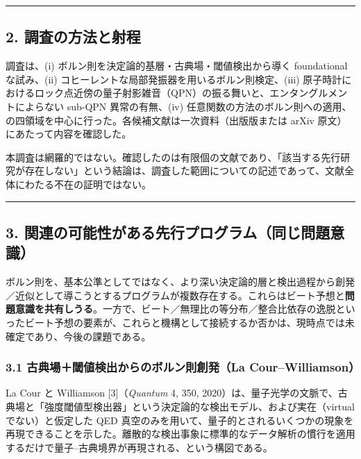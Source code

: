 \documentclass[
]{ltjsarticle}
\begin{document}
\begin{center}\rule{0.5\linewidth}{0.5pt}\end{center}

\subsection{2.
調査の方法と射程}\label{ux8abfux67fbux306eux65b9ux6cd5ux3068ux5c04ux7a0b}

調査は、(i) ボルン則を決定論的基層・古典場・閾値検出から導く
foundational な試み、(ii)
コヒーレントな局部発振器を用いるボルン則検定、(iii)
原子時計におけるロック点近傍の量子射影雑音（QPN）の振る舞いと、エンタングルメントによらない
sub-QPN 異常の有無、(iv)
任意関数の方法のボルン則への適用、の四領域を中心に行った。各候補文献は一次資料（出版版または
arXiv 原文）にあたって内容を確認した。

本調査は網羅的ではない。確認したのは有限個の文献であり、「該当する先行研究が存在しない」という結論は、調査した範囲についての記述であって、文献全体にわたる不在の証明ではない。

\begin{center}\rule{0.5\linewidth}{0.5pt}\end{center}

\subsection{3.
関連の可能性がある先行プログラム（同じ問題意識）}\label{ux95a2ux9023ux306eux53efux80fdux6027ux304cux3042ux308bux5148ux884cux30d7ux30edux30b0ux30e9ux30e0ux540cux3058ux554fux984cux610fux8b58}

ボルン則を、基本公準としてではなく、より深い決定論的層と検出過程から創発／近似として導こうとするプログラムが複数存在する。これらはビート予想と\textbf{問題意識を共有しうる}。一方で、ビート／無理比の等分布／整合比依存の逸脱といったビート予想の要素が、これらと機構として接続するか否かは、現時点では未確定であり、今後の課題である。

\subsubsection{3.1 古典場＋閾値検出からのボルン則創発（La
Cour--Williamson）}\label{ux53e4ux5178ux5834ux95beux5024ux691cux51faux304bux3089ux306eux30dcux30ebux30f3ux5247ux5275ux767ala-courwilliamson}

La Cour と Williamson {[}3{]}（\emph{Quantum} 4, 350,
2020）は、量子光学の文脈で、古典場と「強度閾値型検出器」という決定論的な検出モデル、および実在（virtual
でない）と仮定した QED
真空のみを用いて、量子的とされるいくつかの現象を再現できることを示した。離散的な検出事象に標準的なデータ解析の慣行を適用するだけで量子--古典境界が再現される、という構図である。
\end{document}
